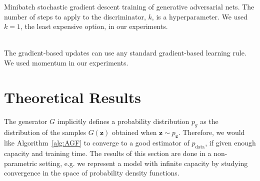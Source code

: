 \documentclass{article} %
\begin{document}
\begin{algorithm}[ht]
\caption{\small Minibatch stochastic gradient descent training of generative adversarial nets.
The number of steps to apply to the discriminator, $k$, is a hyperparameter. We used $k=1$, the
least expensive option, in our experiments.
}
\begin{algorithmic}
\label{alg:AGF}
   \ENDFOR
  \ENDFOR
  \\The gradient-based updates can use any standard gradient-based learning rule. We used momentum in our experiments.
\end{algorithmic}
\end{algorithm}


\section{Theoretical Results}
\label{sec:theory}

The generator $G$ implicitly defines a probability distribution $p_g$ as
the distribution of the samples $G(\bm{z})$ obtained when $\bm{z} \sim
p_{\bm{z}}$. Therefore, we would like Algorithm~\ref{alg:AGF} to converge to a
good estimator of $p_\text{data}$, if given enough capacity and training time. The
results of this section are done in a non-parametric setting, e.g. we represent a
model with infinite capacity by studying convergence in the space of probability
density functions.
\end{document}
